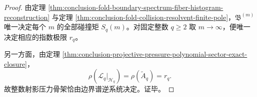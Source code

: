 \begin{proof}
由定理 \ref{thm:conclusion-fold-boundary-spectrum-fiber-histogram-reconstruction} 与定理 \ref{thm:conclusion-fold-collision-resolvent-finite-pole}，\(\mathfrak B^{(m)}\) 唯一决定每个 \(m\) 的全部碰撞矩 \(S_q(m)\)。对固定整数 \(q\ge 2\) 取 \(m\to\infty\)，便唯一决定相应的指数极限 \(r_q\)。

另一方面，由定理 \ref{thm:conclusion-projective-pressure-polynomial-sector-exact-closure}，
\[
\rho(\mathcal L_q\vert_{\mathcal H_q})=\rho(\widetilde A_q)=r_q.
\]
故整数射影压力骨架恰由边界谱逆系统决定。证毕。
\end{proof}
